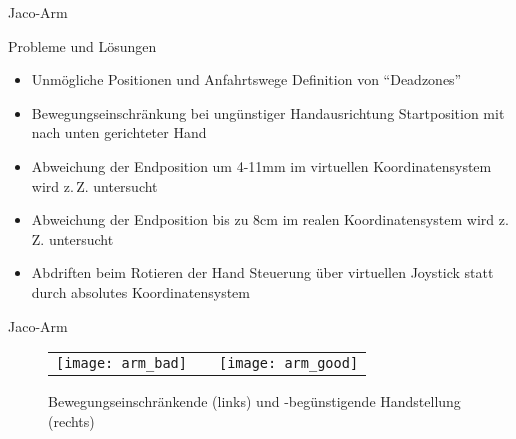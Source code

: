 \begin{frame}[t]{Jaco-Arm}
	\begin{block}{Probleme und Lösungen}
		\begin{itemize}
			\item Unmögliche Positionen und Anfahrtswege \arrow Definition von
				\enquote{Deadzones}
			\item Bewegungseinschränkung bei ungünstiger Handausrichtung \arrow
				Startposition mit nach unten gerichteter Hand
			\item Abweichung der Endposition um 4-11mm im virtuellen
				Koordinatensystem \arrow wird z.\,Z. untersucht
			\item Abweichung der Endposition bis zu 8cm im realen
				Koordinatensystem \arrow wird z.\,Z. untersucht
			\item Abdriften beim Rotieren der Hand \arrow Steuerung über virtuellen
				Joystick statt durch absolutes Koordinatensystem
		\end{itemize}
	\end{block}
\end{frame}

\begin{frame}[t]{Jaco-Arm}
	\begin{figure}
		\begin{tabular}{lp{0.5cm}r}
			\texttt{[image: arm\_bad]} &
			&
			\texttt{[image: arm\_good]} \\
		\end{tabular}
		\caption{Bewegungseinschränkende (links) und -begünstigende Handstellung (rechts)}
	\end{figure}
\end{frame}

